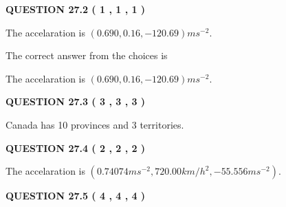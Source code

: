\documentclass[12pt]{article}
\begin{document}
\vspace{0.2in}
  
{\textbf{\Large{QUESTION
27.2 
 (           1 ,           1 ,           1 )
}}}
  
  


 
 
\noindent{}
 
 
The accelaration is $  %
(
0.690,
0.16,
-120.69)
ms^{-2} $.
 
 
 
 
 
 
\noindent{}

The correct answer from the choices is


The accelaration is $  %
(
0.690,
0.16,
-120.69)
ms^{-2} $.
 
 
 
  
\vspace{0.2in}
  
{\textbf{\Large{QUESTION
27.3 
 (           3 ,           3 ,           3 )
}}}
  
  
 
 
\noindent{}
 
 
Canada has  %
10 provinces and  %
3 territories.
 
 
 
 
  
\vspace{0.2in}
  
{\textbf{\Large{QUESTION
27.4 
 (           2 ,           2 ,           2 )
}}}
  
  
 
 
\noindent{}
 
 
The accelaration is
$(
0.74074ms^{-2},
720.00km/h^2,
-55.556ms^{-2}
).
$
 
 
 
 
  
\vspace{0.2in}
  
{\textbf{\Large{QUESTION
27.5 
 (           4 ,           4 ,           4 )
}}}
  
  
 
 
\noindent{}
  
\end{document}
